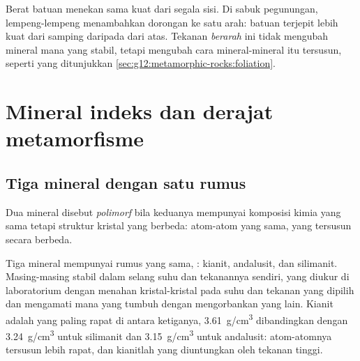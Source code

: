 Berat batuan menekan sama kuat dari segala sisi. Di sabuk pegunungan,
lempeng-lempeng menambahkan dorongan ke satu arah: batuan terjepit lebih kuat
dari samping daripada dari atas. Tekanan \emph{berarah} ini tidak mengubah
mineral mana yang stabil, tetapi mengubah cara mineral-mineral itu tersusun,
seperti yang ditunjukkan \cref{sec:g12:metamorphic-rocks:foliation}.

\section{Mineral indeks dan derajat metamorfisme}

\subsection{Tiga mineral dengan satu rumus}

\begin{definition}[Polimorf]\label{def:g12:metamorphic-rocks:polymorph}
Dua mineral disebut \emph{polimorf} bila keduanya mempunyai
komposisi kimia yang sama tetapi struktur kristal yang berbeda: atom-atom yang
sama, yang tersusun secara berbeda.
\end{definition}

Tiga mineral mempunyai rumus yang sama, : kianit, andalusit, dan
silimanit. Masing-masing stabil dalam selang suhu dan tekanannya sendiri, yang
diukur di laboratorium dengan menahan kristal-kristal pada suhu dan tekanan
yang dipilih dan mengamati  mana yang tumbuh dengan mengorbankan yang
lain. Kianit adalah yang paling rapat di antara ketiganya,
\qty{3.61}{g/cm^3} dibandingkan dengan \qty{3.24}{g/cm^3} untuk silimanit dan
\qty{3.15}{g/cm^3} untuk andalusit: atom-atomnya tersusun lebih rapat, dan
kianitlah yang diuntungkan oleh tekanan tinggi.

